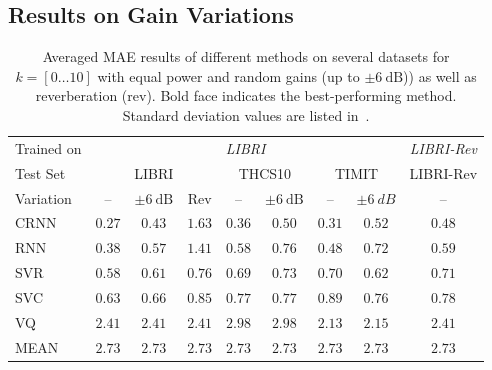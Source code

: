 \subsection{Results on Gain Variations}%
\label{ssec:exp_random_gains}
%
\begin{table}[t]
\scriptsize

\caption{Averaged MAE results of different methods on several datasets for \( k = [0 \ldots 10] \) with equal power and random gains (up to $\pm 6~\mbox{dB}$)) as well as reverberation (rev). Bold face indicates the best-performing method. Standard deviation values are listed in~\cite{stoeter19}.}

\begin{center}
\begin{tabular}{lcccccccc}
\toprule
Trained on & \multicolumn{7}{c}{\emph{LIBRI}} & \multicolumn{1}{c}{\emph{LIBRI-Rev}} \\
\cmidrule(r){2-8} \cmidrule(r){9-9}
Test Set & \multicolumn{3}{c}{LIBRI} & \multicolumn{2}{c}{THCS10} & \multicolumn{2}{c}{TIMIT} & \multicolumn{1}{c}{LIBRI-Rev} \\
\cmidrule(r){2-4} \cmidrule(r){5-6} \cmidrule(r){7-8} \cmidrule(r){9-9}
Variation &     – &     $\pm 6~\mbox{dB}$ & Rev &  – &     $\pm 6~\mbox{dB}$ &     – &  $\pm 6~dB$ & – \\
\midrule
CRNN    &  $\mathbf{0.27}$ & $\mathbf{0.43}$ & $1.63$ & $\mathbf{0.36}$  & $\mathbf{0.50}$ & $\mathbf{0.31}$ & $\mathbf{0.52}$  &  $\mathbf{0.48}$\\
RNN~\cite{stoeter17} & $0.38$ & $0.57$ & $1.41$ & $0.58$ &$0.76$ & $0.48$ & $0.72$ & $0.59$\\
SVR     &  $0.58$ & $0.61$ & $\mathbf{0.76}$ & $0.69$ &  $0.73$ & $0.70$ & $0.62$ & $0.71$ \\
SVC     &  $0.63$ & $0.66$ & $0.85$ & $0.77$ &  $0.77$ & $0.89$ & $0.76$ & $0.78$ \\
VQ \cite{sayoud10} &  $2.41$ & $2.41$ & $2.41$ & $2.98$ &  $2.98$ & $2.13$ & $2.15$ & $2.41$ \\
MEAN    &  $2.73$ & $2.73$ & $2.73$ & $2.73$ &  $2.73$ & $2.73$ & $2.73$ & $2.73$ \\
\bottomrule
\end{tabular}
\end{center}
\label{tab:expgainreverb}
\end{table}

